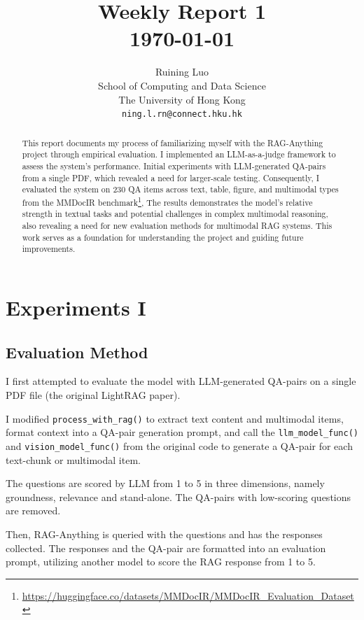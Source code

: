 \documentclass{article}
\title{
  Weekly Report 1 \\
  \vspace{1em}
  \small{\normalfont \today} 
}
\author{
  Ruining Luo \\
  School of Computing and Data Science \\
  The University of Hong Kong\\
  \texttt{ning.l.rn@connect.hku.hk} \\
}
\begin{document}
\maketitle

\begin{abstract}
This report documents my process of familiarizing myself with the RAG-Anything project through empirical evaluation.
I implemented an LLM-as-a-judge framework to assess the system's performance. 
Initial experiments with LLM-generated QA-pairs from a single PDF, which revealed a need for larger-scale testing. 
Consequently, I evaluated the system on 230 QA items across text, table, figure, and multimodal types from the MMDocIR benchmark\footnote{\url{https://huggingface.co/datasets/MMDocIR/MMDocIR_Evaluation_Dataset}}, 
The results demonstrates the model's relative strength in textual tasks and potential challenges in complex multimodal reasoning, also revealing a need for new evaluation methods for multimodal RAG systems. 
This work serves as a foundation for understanding the project and guiding future improvements.

\end{abstract}

\section{Experiments I}

  \subsection{Evaluation Method}
  I first attempted to evaluate the model with LLM-generated QA-pairs on a single PDF file (the original LightRAG paper).

  I modified \verb|process_with_rag()| to extract text content and multimodal items,
  format context into a QA-pair generation prompt,
  and call the \verb|llm_model_func()| and \verb|vision_model_func()| from the original code to generate a QA-pair for each text-chunk or multimodal item.

  The questions are scored by LLM from 1 to 5 in three dimensions, namely groundness, relevance and stand-alone.
  The QA-pairs with low-scoring questions are removed.

  Then, RAG-Anything is queried with the questions and has the responses collected.
  The responses and the QA-pair are formatted into an evaluation prompt, utilizing another model to score the RAG response from 1 to 5.
\end{document}
